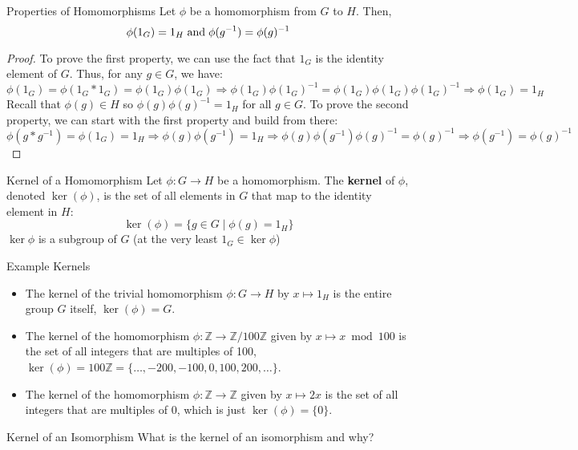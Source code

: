 \begin{fact}{Properties of Homomorphisms}{}
Let $\phi$ be a homomorphism from $G$ to $H$. Then,
    \begin{equation*}
        \phi(1_G) = 1_H \hspace{0.1cm} \text{and} \hspace{0.1cm} \phi(g^{-1}) = \phi(g)^{-1}
    \end{equation*}
\end{fact}
\begin{proof}
    To prove the first property, we can use the fact that $1_G$ is the identity element of $G$. Thus, for any $g \in G$, we have:
    \begin{equation*}
        \phi(1_G) = \phi(1_G * 1_G) = \phi(1_G)\phi(1_G) \Rightarrow \phi(1_G)\phi(1_G)^{-1} = \phi(1_G)\phi(1_G)\phi(1_G)^{-1} \Rightarrow \phi(1_G) = 1_H
    \end{equation*}
    Recall that $\phi(g) \in H$ so $\phi(g)\phi(g)^{-1} = 1_H$ for all $g \in G$. To prove the second property, we can start with the first property and build from there:
    \begin{equation*}
        \phi(g * g^{-1}) = \phi(1_G) = 1_H \Rightarrow \phi(g)\phi(g^{-1}) = 1_H \Rightarrow \phi(g)\phi(g^{-1})\phi(g)^{-1} = \phi(g)^{-1} \Rightarrow \phi(g^{-1}) = \phi(g)^{-1}
    \end{equation*}
\end{proof}

\begin{definition}{Kernel of a Homomorphism}{}
    Let $\phi: G \to H$ be a homomorphism. The \textbf{kernel} of $\phi$, denoted $\ker(\phi)$, is the set of all elements in $G$ that map to the identity element in $H$:
    \begin{equation*}
        \ker(\phi) = \{ g \in G \mid \phi(g) = 1_H \}
    \end{equation*}
    $\ker \phi$ is a subgroup of $G$ (at the very least $1_G \in \ker \phi$)
\end{definition}

\begin{example}{Example Kernels}{}
    \begin{itemize}
        \item The kernel of the trivial homomorphism $\phi: G \to H$ by $x \mapsto 1_H$ is the entire group $G$ itself, $\ker(\phi) = G$.
        \item The kernel of the homomorphism $\phi: \mathbb{Z} \to \mathbb{Z}/100\mathbb{Z}$ given by $x \mapsto x \bmod 100$ is the set of all integers that are multiples of 100, $\ker(\phi) = 100\mathbb{Z} = \{\dots, -200, -100, 0, 100, 200, \dots\}$.
        \item The kernel of the homomorphism $\phi: \mathbb{Z} \to \mathbb{Z}$ given by $x \mapsto 2x$ is the set of all integers that are multiples of 0, which is just $\ker(\phi) = \{0\}$.
    \end{itemize}

\end{example}

\begin{question}{Kernel of an Isomorphism}{}
    What is the kernel of an isomorphism and why?
\end{question}
